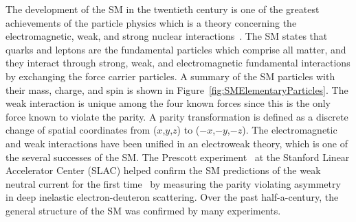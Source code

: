 The development of the SM in the twentieth century is one of the greatest achievements of the particle physics which is a theory concerning the electromagnetic, weak, and strong nuclear interactions~\cite{book:QuarksAndLeptones}. 
The SM states that quarks and leptons are the fundamental particles which comprise all matter, and they interact through strong, weak, and electromagnetic fundamental interactions by exchanging the force carrier particles.
A summary of the SM particles with their mass, charge, and spin is shown in Figure~\ref{fig:SMElementaryParticles}.
The weak interaction is unique among the four known forces since this is the only force known to violate the parity. 
A parity transformation is defined as a discrete change of spatial coordinates from ($x$,$y$,$z$) to ($-x$,$-y$,$-z$).
The electromagnetic and weak interactions have been unified in an electroweak theory, which is one of the several successes of the SM. The Prescott experiment~\cite{Prescott1978347} at the Stanford Linear Accelerator Center (SLAC) helped confirm the SM predictions of the weak neutral current for the first time~\cite{Hasert1973138, Hasert1973121, Hasert19741} by measuring the parity violating asymmetry in deep inelastic electron-deuteron scattering. 
Over the past half-a-century, the general structure of the SM was confirmed by many experiments.

